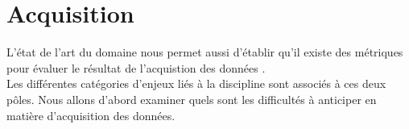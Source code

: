 \section{Acquisition}
L'état de l'art du domaine nous permet aussi d'établir qu'il existe des métriques pour évaluer le résultat de l'acquistion des données \cite{giotWeb}.\\
Les différentes catégories d'enjeux liés à la discipline sont associés à ces deux pôles. Nous allons d'abord examiner quels sont les difficultés à anticiper en matière d'acquisition des données.



